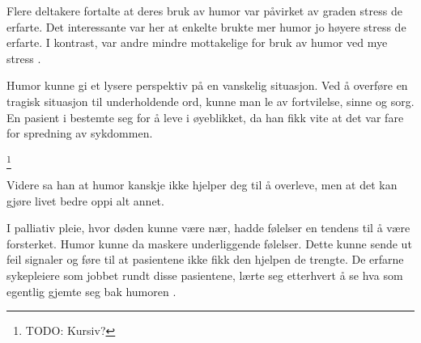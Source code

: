 Flere deltakere fortalte at deres bruk av humor var påvirket av graden stress
de erfarte. Det interessante var her at enkelte brukte mer humor jo høyere
stress de erfarte. I kontrast, var andre mindre mottakelige for bruk av humor
ved mye stress \cite{dean2005}.

Humor kunne gi et lysere perspektiv på en vanskelig situasjon. Ved å overføre
en tragisk situasjon til underholdende ord, kunne man le av fortvilelse, sinne
og sorg. En pasient i  bestemte seg for å leve i
øyeblikket, da han fikk vite at det var fare for spredning av sykdommen.

\footnote{TODO: Kursiv?}

Videre sa han at humor kanskje ikke hjelper deg til å overleve, men at det kan
gjøre livet bedre oppi alt annet.

I palliativ pleie, hvor døden kunne være nær, hadde følelser en tendens til å
være forsterket. Humor kunne da maskere underliggende følelser. Dette kunne
sende ut feil signaler og føre til at pasientene ikke fikk den hjelpen de
trengte. De erfarne sykepleiere som jobbet rundt disse pasientene, lærte seg
etterhvert å se hva som egentlig gjemte seg bak humoren \cite{mccreaddie2011}.
